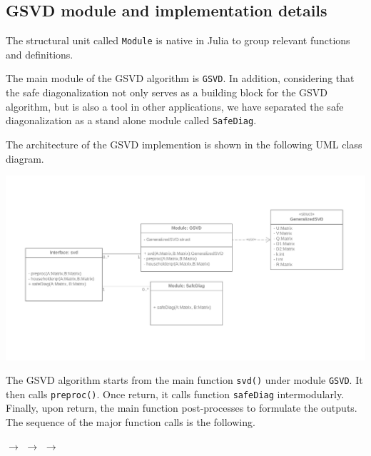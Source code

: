 \subsection{GSVD module and implementation details}

The structural unit called \texttt{Module} is native in Julia to 
group relevant functions and definitions. 

The main module of the GSVD algorithm is \texttt{GSVD}. 
In addition, considering that the safe diagonalization not only serves 
as a building block for the GSVD algorithm, but is also a 
tool in other applications, we have separated the safe diagonalization 
as a stand alone module called \texttt{SafeDiag}. 

The architecture of the GSVD implemention 
is shown in the following UML class diagram.  %
\begin{center} 
\includegraphics[width=0.75\linewidth]{fig/GSVD_class.png}
\end{center} 

The GSVD algorithm starts from the main function \texttt{svd()} 
under module \texttt{GSVD}. It then calls \texttt{preproc()}. 
Once return, it calls function \texttt{safeDiag} intermodularly. 
Finally, upon return, the main function post-processes to 
formulate the outputs. The sequence of the major function 
calls is the following. 

\begin{center}
 $\rightarrow$ 
 $\rightarrow$ 
 $\rightarrow$ 
\end{center}


